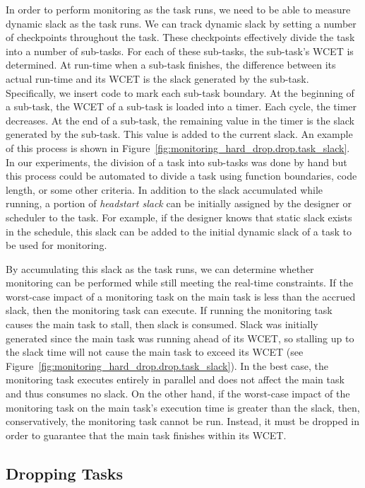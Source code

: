 In order to perform monitoring as the task runs, we need to be able to measure
dynamic slack as the task runs.  We can track dynamic slack by setting a number
of checkpoints throughout the task.  These checkpoints effectively divide the
task into a number of sub-tasks.  For each of these sub-tasks, the sub-task's
WCET is determined.  At run-time when a sub-task finishes, the difference
between its actual run-time and its WCET is the slack generated by the
sub-task.  Specifically, we insert code to mark each sub-task boundary.  At the
beginning of a sub-task, the WCET of a sub-task is loaded into a timer. Each
cycle, the timer decreases. At the end of a sub-task, the remaining value in
the timer is the slack generated by the sub-task. This value is added to the
current slack.  An example of this process is shown in
Figure~\ref{fig:monitoring_hard_drop.drop.task_slack}. In our experiments, the
division of a task into sub-tasks was done by hand but this process could be
automated to divide a task using function boundaries, code length, or some
other criteria.  In addition to the slack accumulated while running, a portion
of \emph{headstart slack} can be initially assigned by the designer or
scheduler to the task. For example, if the designer knows that static slack
exists in the schedule, this slack can be added to the initial dynamic slack of
a task to be used for monitoring.

By accumulating this slack as the task runs, we can determine whether
monitoring can be performed while still meeting the real-time constraints. If
the worst-case impact of a monitoring task on the main task is less than the
accrued slack, then the monitoring task can execute.  If running the monitoring
task causes the main task to stall, then slack is consumed.
Slack was initially generated since the main task was running ahead of its
WCET, so stalling up to the slack time will not cause the main task to exceed
its WCET (see Figure~\ref{fig:monitoring_hard_drop.drop.task_slack}). In the
best case, the monitoring task executes entirely in parallel and does not
affect the main task and thus consumes no slack. On the other hand, if the
worst-case impact of the monitoring task on the main task's execution time is
greater than the slack, then, conservatively, the monitoring task cannot be
run. Instead, it must be dropped in order to guarantee that the main task
finishes within its WCET.

\subsection{Dropping Tasks}
\label{sec:monitoring_hard_drop.drop.dropping_tasks}

